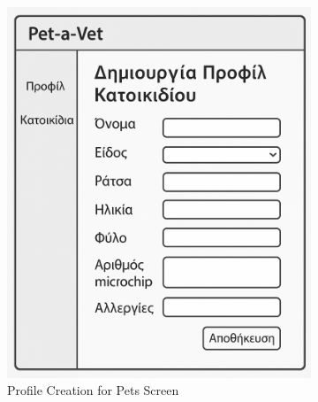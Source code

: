 \documentclass[12pt,a4paper,twoside]{book}
\begin{document}
\begin{figure}[H]
    \centering
    \begin{subfigure}[b]{0.48\textwidth}
        \centering
        \includegraphics[width=\textwidth]{Resources/Mockup Screens/Pet_profile.png}
        \caption{Profile Creation for Pets Screen}\label{fig:mockup11}
    \end{subfigure}
    \hfill
    \begin{subfigure}[b]{0.48\textwidth}
        \centering

\end{subfigure}
\end{figure}
\end{document}
